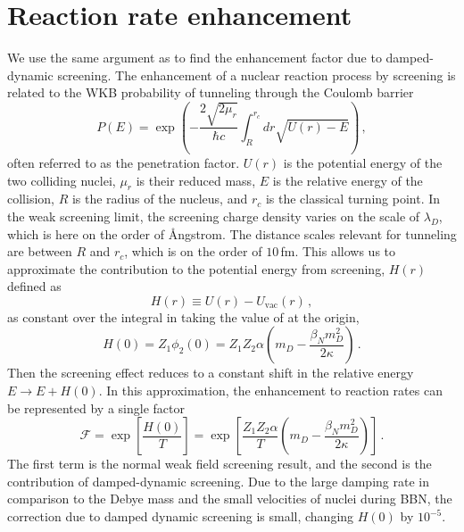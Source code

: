 \section{Reaction rate enhancement}
We use the same argument as \cite{Salpeter:1954nc} to find the enhancement factor due to damped-dynamic screening. The enhancement of a nuclear reaction process by screening is related to the WKB probability of tunneling through the Coulomb barrier
\begin{equation} \label{eq:penprob}
    P(E) = \exp{\left( - \frac{2\sqrt{2 \mu_r}}{\hbar c}\int_{R}^{r_c}dr \sqrt{U(r)-E}\right)}\,,
\end{equation}
often referred to as the penetration factor. $U(r)$ is the potential energy of the two colliding nuclei, $\mu_r$ is their reduced mass, $E$ is the relative energy of the collision, $R$ is the radius of the nucleus, and $r_c$ is the classical turning point. In the weak screening limit, the screening charge density varies on the scale of $\lambda_D$, which is here on the order of \AA ngstrom. The distance scales relevant for tunneling are between $R$ and $r_c$, which is on the order of $10\,$fm. This allows us to approximate the contribution to the potential energy from screening, $H(r)$ defined as
\begin{equation}
    H(r) \equiv U(r) - U_\text{vac}(r)\,,
\end{equation}
as constant over the integral in  taking the value of  at the origin,
\begin{equation}
     H(0) = Z_1\phi_2(0) = Z_1 Z_2 \alpha \left(m_D - \frac{\beta_N m_D^2}{2 \kappa}\right)\,.
\end{equation}
Then the screening effect reduces to a constant shift in the relative energy $E \rightarrow E+H(0)$. In this approximation, the enhancement to reaction rates can be represented by a single factor \cite{Salpeter:1954nc, PhysRevC.89.015802}
\begin{equation}\label{eq:DDSenhance}
   \mathcal{F} = \exp\left[\frac{H(0)}{T} \right]=\exp\left[\frac{Z_1 Z_2 \alpha}{T} \left(m_D - \frac{\beta_N m_D^2}{2 \kappa}\right)\right]\,.
\end{equation}
The first term is the normal weak field screening result, and the second is the contribution of damped-dynamic screening. Due to the large damping rate in comparison to the Debye mass and the small velocities of nuclei  during BBN, the correction due to damped dynamic screening is small, changing $H(0)$ by $10^{-5}$. 
